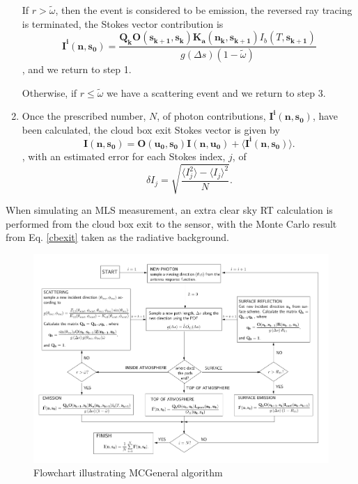 \begin{enumerate}
If $r>\tilde{\omega}$, then the event is considered to be emission,
the reversed ray tracing is terminated, the Stokes vector contribution is
\begin{equation}
\mathbf{I^i(n,s_0)}=\frac{\mathbf{Q_k O(s_{k+1},s_k)}
  \mathbf{K_a(n_k,s_{k+1})} I_b(T,\mathbf{s_{k+1}})}
  {g\left(\Delta s\right)\left(1-\tilde{\omega}\right)}
\label{Iemission3}
\end{equation}
, and we return to step 1.

Otherwise, if $r\le\tilde{\omega}$
we have a scattering event and we return to step 3.
\item
Once the prescribed number, $N$,  of photon contributions,
$\mathbf{I^i(n,s_0)}$, have been calculated, the cloud box exit Stokes
vector is given by
\begin{equation}
\mathbf{I(n,s_0)}=\mathbf{O(u_0,s_0)I(n,u_0)}+\langle\mathbf{I^i(n,s_0)}\rangle.
\label{cbexit}
\end{equation}
, with an estimated error for each Stokes index, $j$,  of
\begin{equation}
\delta I_j=\sqrt{\frac{\langle I_j^2\rangle-\langle I_j\rangle^2}{N}}.
\label{error}
\end{equation}
\end{enumerate}
When simulating an MLS measurement, an extra clear sky RT calculation
is performed from the cloud box exit to the sensor, with the Monte
Carlo result from Eq. \ref{cbexit} taken as the radiative background.

\begin{figure}[!ht]
\begin{center}
\includegraphics[width=\vsize,angle=90]{flowchart2}
\caption{Flowchart illustrating MCGeneral algorithm}
\end{center}
\label{fig:montecarlo:flowchart}
\end{figure}

 

